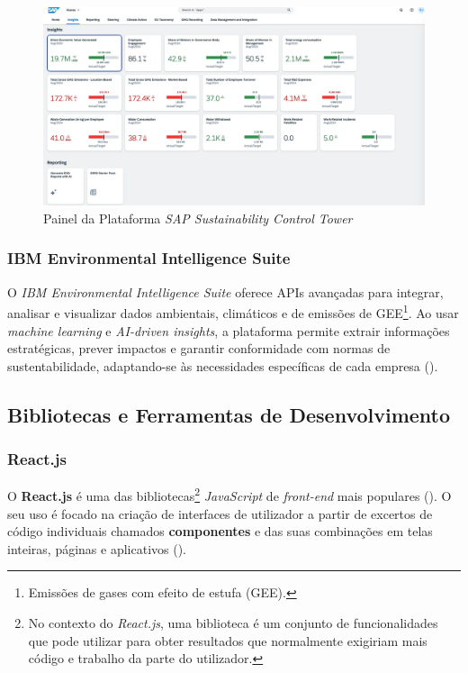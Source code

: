 \begin{figure}[h]
    \centering
    \includegraphics[width=\linewidth]{frontmatter/assets/SAP.png}
    \caption{Painel da Plataforma \textit{SAP Sustainability Control Tower}}
    \label{fig:sap_sustainability_control_tower}
\end{figure}

\subsubsection{IBM Environmental Intelligence Suite}

O \textit{IBM Environmental Intelligence Suite} oferece APIs avançadas para integrar, analisar e visualizar dados ambientais, climáticos e de emissões de GEE\footnote{Emissões de gases com efeito de estufa (GEE).}. Ao usar \textit{machine learning} e \textit{AI-driven insights}, a plataforma permite extrair informações estratégicas, prever impactos e garantir conformidade com normas de sustentabilidade, adaptando-se às necessidades específicas de cada empresa (\cite{IBM2025}).

\subsection{Bibliotecas e Ferramentas de Desenvolvimento}
\label{subsec: BFD}

\subsubsection{React.js}

O \textbf{React.js} é uma das bibliotecas\footnote{No contexto do \textit{React.js}, uma biblioteca é um conjunto de funcionalidades que pode utilizar para obter resultados que normalmente exigiriam mais código e trabalho da parte do utilizador.} \textit{JavaScript} de \textit{front-end} mais populares (\cite{Schwarzmuller2022}). O seu uso é focado na criação de interfaces de utilizador a partir de excertos de código individuais chamados \textbf{componentes} e das suas combinações em telas inteiras, páginas e aplicativos (\cite{React2025}).

